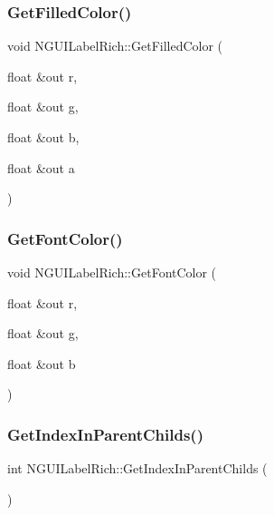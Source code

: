 \hypertarget{class_n_g_u_i_label_rich_a8c2c5ebbe0ea2b3fd6799e8c5ae8ebd5}{}\label{class_n_g_u_i_label_rich_a8c2c5ebbe0ea2b3fd6799e8c5ae8ebd5} 
\subsubsection{\texorpdfstring{Get\+Filled\+Color()}{GetFilledColor()}}
{\footnotesize\ttfamily void N\+G\+U\+I\+Label\+Rich\+::\+Get\+Filled\+Color (\begin{DoxyParamCaption}\item[{float \&out}]{r,  }\item[{float \&out}]{g,  }\item[{float \&out}]{b,  }\item[{float \&out}]{a }\end{DoxyParamCaption})}

\hypertarget{class_n_g_u_i_label_rich_a7be11923a166bd12d00b502020c3819d}{}\label{class_n_g_u_i_label_rich_a7be11923a166bd12d00b502020c3819d} 
\subsubsection{\texorpdfstring{Get\+Font\+Color()}{GetFontColor()}}
{\footnotesize\ttfamily void N\+G\+U\+I\+Label\+Rich\+::\+Get\+Font\+Color (\begin{DoxyParamCaption}\item[{float \&out}]{r,  }\item[{float \&out}]{g,  }\item[{float \&out}]{b }\end{DoxyParamCaption})}

\hypertarget{class_n_g_u_i_label_rich_a6d5bb615650cdafac4155c40e2673a70}{}\label{class_n_g_u_i_label_rich_a6d5bb615650cdafac4155c40e2673a70} 
\subsubsection{\texorpdfstring{Get\+Index\+In\+Parent\+Childs()}{GetIndexInParentChilds()}}
{\footnotesize\ttfamily int N\+G\+U\+I\+Label\+Rich\+::\+Get\+Index\+In\+Parent\+Childs (\begin{DoxyParamCaption}{ }\end{DoxyParamCaption})}

